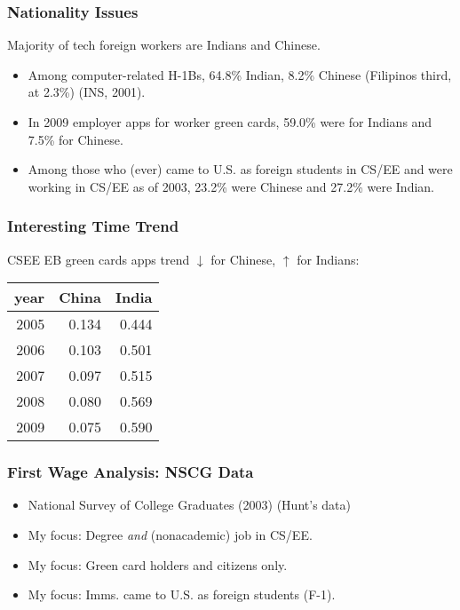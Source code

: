 \documentclass{beamer}
\begin{document}
\begin{frame}
\frametitle{Nationality Issues}
\pause

Majority of tech foreign workers are Indians and Chinese. 
\pause

\begin{itemize}

\item Among computer-related H-1Bs, 64.8\% Indian, 8.2\% Chinese
(Filipinos third, at 2.3\%)  (INS, 2001).
\pause

\item In 2009 employer apps for worker green cards, 59.0\% were for
Indians and 7.5\% for Chinese.
\pause

\item Among those who (ever) came to U.S. as foreign students in CS/EE
and were working in CS/EE as of 2003, 23.2\% were Chinese and 
27.2\% were Indian.

\end{itemize}

\end{frame}

\begin{frame}
\frametitle{Interesting Time Trend}
\pause

CSEE EB green cards apps trend $\downarrow$ for Chinese, $\uparrow$
for Indians:
\pause

\begin{tabular}{|r|r|r|}
\hline
year  & China & India \\ \hline
\hline
2005 & 0.134 & 0.444 \\ \hline
2006 & 0.103 & 0.501 \\ \hline
2007 & 0.097 & 0.515 \\ \hline
2008 & 0.080 & 0.569 \\ \hline
2009 & 0.075 & 0.590 \\ \hline
\end{tabular}

\end{frame}

\begin{frame}
\frametitle{First Wage Analysis:  NSCG Data}
\pause

\begin{itemize}

\item National Survey of College Graduates (2003) (Hunt's data)
\pause 

\item My focus: Degree {\it and} (nonacademic) job in CS/EE.
\pause

\item My focus: Green card holders and citizens only.
\pause

\item My focus:  Imms. came to U.S. as foreign students (F-1).

\end{itemize}

\end{frame}
\end{document}
